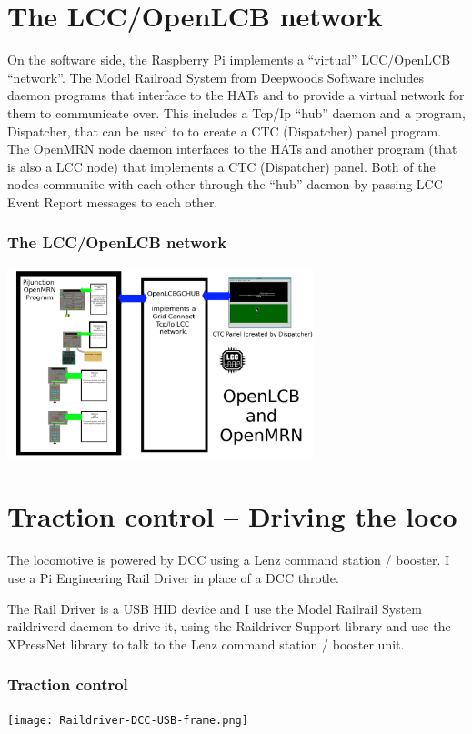 \section{The LCC/OpenLCB network}

On the software side, the Raspberry Pi implements a ``virtual'' LCC/OpenLCB
``network''. The Model Railroad System from Deepwoods Software includes daemon
programs that interface to the HATs and to provide a virtual network for them
to communicate over. This includes a Tcp/Ip ``hub'' daemon and a program,
Dispatcher, that can be used to to create a CTC (Dispatcher) panel program.
The OpenMRN node daemon interfaces to the HATs and another program (that is
also a LCC node) that implements a CTC (Dispatcher) panel. Both of the nodes
communite with each other through the ``hub'' daemon by passing LCC Event
Report messages to each other. 

\begin{frame}
    \frametitle{The LCC/OpenLCB network}
    \includegraphics[width=3.5in]{LCC-Network-frame.png}
\end{frame}


\section{Traction control -- Driving the loco}

The locomotive is powered by DCC using a Lenz command station / booster.  I 
use a Pi Engineering Rail Driver in place of a DCC throtle.

The Rail Driver is a USB HID device and I use the Model Railrail System 
raildriverd daemon to drive it, using the Raildriver Support library and use 
the XPressNet library to talk to the Lenz command station / booster unit.

\begin{frame}
    \frametitle{Traction control}
    \texttt{[image: Raildriver-DCC-USB-frame.png]}
\end{frame}


